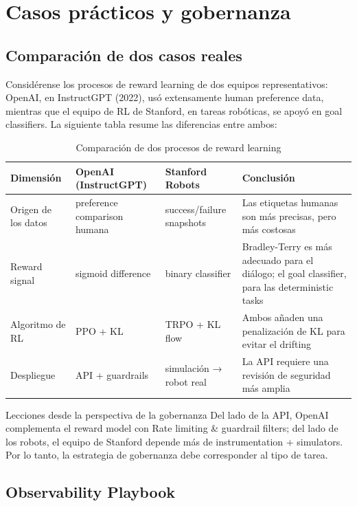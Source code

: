 \section{Casos prácticos y gobernanza}

\subsection{Comparación de dos casos reales}

Considérense los procesos de reward learning de dos equipos representativos: OpenAI, en InstructGPT (2022), usó extensamente human preference data, mientras que el equipo de RL de Stanford, en tareas robóticas, se apoyó en goal classifiers. La siguiente tabla resume las diferencias entre ambos:

\begin{table}[H]
\centering
\begin{tabular}{p{} p{} p{} p{}}
\toprule
Dimensión & OpenAI (InstructGPT) & Stanford Robots & Conclusión \\
\midrule
Origen de los datos & preference comparison humana & success/failure snapshots & Las etiquetas humanas son más precisas, pero más costosas \\
Reward signal & sigmoid difference & binary classifier & Bradley-Terry es más adecuado para el diálogo; el goal classifier, para las deterministic tasks \\
Algoritmo de RL & PPO + KL & TRPO + KL flow & Ambos añaden una penalización de KL para evitar el drifting \\
Despliegue & API + guardrails & simulación → robot real & La API requiere una revisión de seguridad más amplia \\
\bottomrule
\end{tabular}
\caption{Comparación de dos procesos de reward learning}
\end{table}

\begin{warningbox}{Lecciones desde la perspectiva de la gobernanza}
Del lado de la API, OpenAI complementa el reward model con Rate limiting & guardrail filters; del lado de los robots, el equipo de Stanford depende más de instrumentation + simulators. Por lo tanto, la estrategia de gobernanza debe corresponder al tipo de tarea.
\end{warningbox}

\subsection{Observability Playbook}

